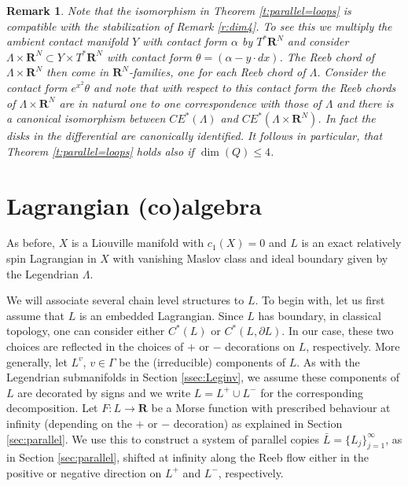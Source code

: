 \documentclass{gtpart}
\newtheorem{rem}[thm]{Remark}
\renewcommand{\R}{\mathbf{R}}
\begin{document}
\begin{rem}\label{r:dim4iso}
	Note that the isomorphism in Theorem \ref{t:parallel=loops} is compatible with the stabilization of Remark \ref{r:dim4}. To see this we multiply the ambient contact manifold $Y$ with contact form $\alpha$ by $T^{\ast}\R^{N}$ and consider $\Lambda\times\R^{N}\subset Y\times T^{\ast}\R^{N}$ with contact form $\theta=(\alpha - y\cdot dx)$. The Reeb chord of $\Lambda\times\R^{N}$ then come in $\R^{N}$-families, one for each Reeb chord of $\Lambda$. Consider the contact form $e^{x^{2}}\theta$ and note that with respect to this contact form the Reeb chords of $\Lambda\times\R^{N}$ are in natural one to one correspondence with those of $\Lambda$ and there is a canonical isomorphism between $CE^{\ast}(\Lambda)$ and $CE^{\ast}(\Lambda\times\R^{N})$. In fact the disks in the differential are canonically identified. It follows in particular, that Theorem \ref{t:parallel=loops} holds also if $\dim(Q)\le 4$.   
\end{rem}

\section{Lagrangian (co)algebra}
As before, $X$ is a Liouville manifold with $c_1(X)=0$ and $L$ is an
exact relatively spin Lagrangian in $X$ with vanishing Maslov class and ideal boundary given by the Legendrian $\Lambda$. 

We will associate several chain level structures to $L$. To begin with, let us first assume that $L$
is an embedded Lagrangian. Since $L$ has boundary, in classical topology, one can consider either $C^*(L)$ or $C^*(L,
\partial L)$. In our case, these two choices are reflected in the choices of $+$ or $-$ decorations
on $L$, respectively. More generally, let $L^{v}$, $v\in \Gamma$ be the (irreducible) components of $L$. As
with the Legendrian submanifolds in Section \ref{ssec:Leginv}, we assume these components of
$L$ are decorated by signs and we write $L=L^{+}\cup L^{-}$ for the corresponding decomposition. 
Let $F\colon L\to\R$ be a Morse function with prescribed behaviour at infinity (depending on
the $+$ or $-$ decoration) as explained in
Section \ref{sec:parallel}. We use this to construct a system of parallel copies $\bar
L=\{L_{j}\}_{j=1}^{\infty}$, as in Section \ref{sec:parallel}, shifted at
infinity along the Reeb flow either in the positive or negative direction on $L^{+}$ and $L^{-}$, respectively. 
\end{document}
